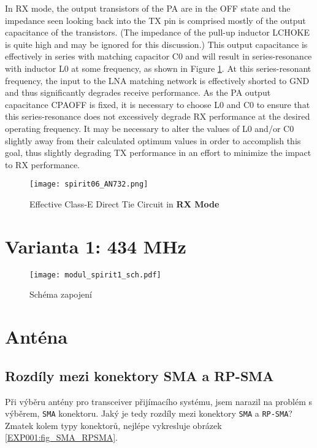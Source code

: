       In RX mode, the output transistors of the PA are in the OFF state and the impedance seen looking 
      back into the TX pin is comprised mostly of the output capacitance of the transistors. (The 
      impedance of the pull-up inductor LCHOKE is quite high and may be ignored for this discussion.) 
      This output capacitance is effectively in series with matching capacitor C0 and will result in 
      series-resonance with inductor L0 at some frequency, as shown in Figure \ref{EXP001:fig_spirit06}. 
      At this series-resonant frequency, the input to the LNA matching network is effectively shorted to 
      GND and thus significantly degrades receive performance. As the PA output capacitance CPAOFF is 
      fixed, it is necessary to choose L0 and C0 to ensure that this series-resonance does not 
      excessively degrade RX performance at the desired operating frequency. It may be necessary to alter 
      the values of L0 and/or C0 slightly away from their calculated optimum values in order to 
      accomplish this goal, thus slightly degrading TX performance in an effort to minimize the impact to 
      RX performance.
      
      \begin{figure}[ht!]  %
        \centering
        \texttt{[image: spirit06\_AN732.png]}
        \caption{Effective Class-E Direct Tie Circuit in \textbf{RX Mode}}
        \label{EXP001:fig_spirit06}
      \end{figure}

  \section{Varianta 1: 434 MHz}
    \begin{figure*}[ht!]
      \centering
      \texttt{[image: modul\_spirit1\_sch.pdf]}
      \caption{Schéma zapojení}
      \label{EXP001:fig_exp_sch434MHz}
    \end{figure*}
    
  \section{Anténa}
    \subsection{Rozdíly mezi konektory SMA a RP-SMA}
      Při výběru antény pro transceiver přijímacího systému, jsem narazil na problém s výběrem, \texttt{SMA} 
      konektoru. Jaký je tedy rozdíly mezi konektory \texttt{SMA} a \texttt{RP-SMA}? Zmatek kolem typy 
      konektorů, nejlépe vykresluje obrázek \ref{EXP001:fig_SMA_RPSMA}.
      
